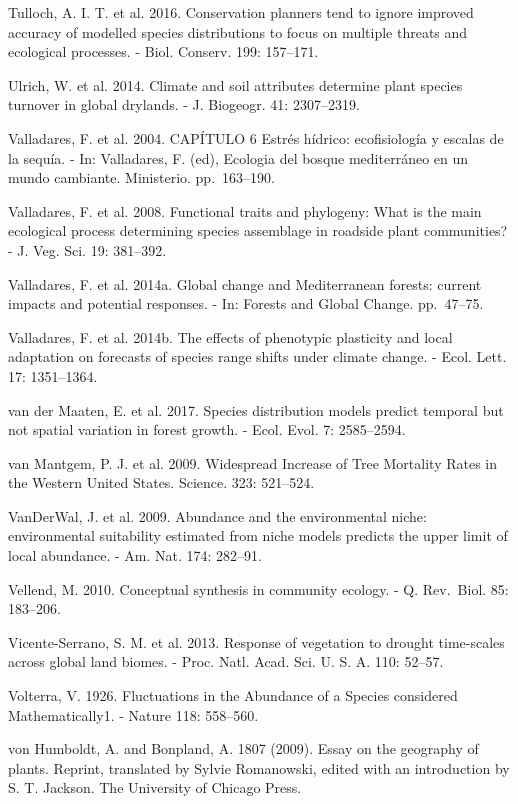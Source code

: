 \documentclass[11pt,twoside]{reedthesis}
\begin{document}
Tulloch, A. I. T. et al. 2016. Conservation planners tend to ignore
improved accuracy of modelled species distributions to focus on multiple
threats and ecological processes. - Biol. Conserv. 199: 157--171.\par
Ulrich, W. et al. 2014. Climate and soil attributes determine plant
species turnover in global drylands. - J. Biogeogr. 41: 2307--2319.\par
Valladares, F. et al. 2004. CAPÍTULO 6 Estrés hídrico: ecofisiología y
escalas de la sequía. - In: Valladares, F. (ed), Ecologia del bosque
mediterráneo en un mundo cambiante. Ministerio. pp.~163--190.\par
Valladares, F. et al. 2008. Functional traits and phylogeny: What is the
main ecological process determining species assemblage in roadside plant
communities? - J. Veg. Sci. 19: 381--392.\par
Valladares, F. et al. 2014a. Global change and Mediterranean forests:
current impacts and potential responses. - In: Forests and Global
Change. pp.~47--75.\par
Valladares, F. et al. 2014b. The effects of phenotypic plasticity and
local adaptation on forecasts of species range shifts under climate
change. - Ecol. Lett. 17: 1351--1364.\par
van der Maaten, E. et al. 2017. Species distribution models predict
temporal but not spatial variation in forest growth. - Ecol. Evol. 7:
2585--2594.\par
van Mantgem, P. J. et al. 2009. Widespread Increase of Tree Mortality
Rates in the Western United States. Science. 323: 521--524.\par
VanDerWal, J. et al. 2009. Abundance and the environmental niche:
environmental suitability estimated from niche models predicts the upper
limit of local abundance. - Am. Nat. 174: 282--91.\par
Vellend, M. 2010. Conceptual synthesis in community ecology. - Q.
Rev.~Biol. 85: 183--206.\par
Vicente-Serrano, S. M. et al. 2013. Response of vegetation to drought
time-scales across global land biomes. - Proc. Natl. Acad. Sci. U. S. A.
110: 52--57.\par
Volterra, V. 1926. Fluctuations in the Abundance of a Species considered
Mathematically1. - Nature 118: 558--560.\par
von Humboldt, A. and Bonpland, A. 1807 (2009). Essay on the geography of
plants. Reprint, translated by Sylvie Romanowski, edited with an
introduction by S. T. Jackson. The University of Chicago Press.\par
\end{document}
